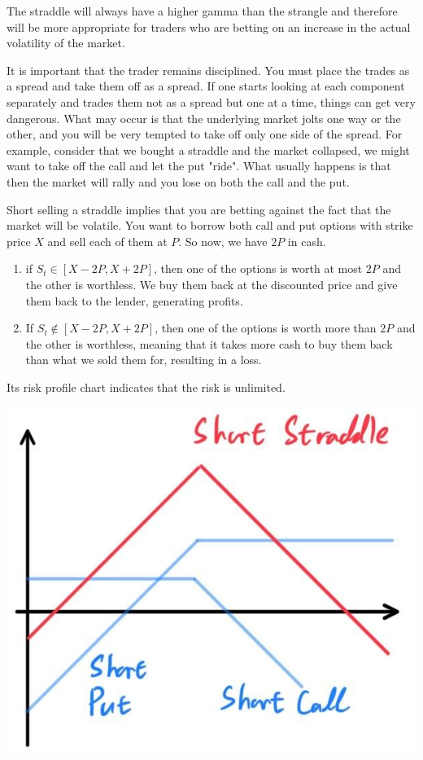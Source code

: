 \documentclass{article}
\begin{document}
  \begin{theorem}
    The straddle will always have a higher gamma than the strangle and therefore will be more appropriate for traders who are betting on an increase in the actual volatility of the market. 
  \end{theorem}

  It is important that the trader remains disciplined. You must place the trades as a spread and take them off as a spread. If one starts looking at each component separately and trades them not as a spread but one at a time, things can get very dangerous. What may occur is that the underlying market jolts one way or the other, and you will be very tempted to take off only one side of the spread. For example, consider that we bought a straddle and the market collapsed, we might want to take off the call and let the put "ride". What usually happens is that then the market will rally and you lose on both the call and the put. 

  \begin{definition}
    Short selling a straddle implies that you are betting against the fact that the market will be volatile. You want to borrow both call and put options with strike price $X$ and sell each of them at $P$. So now, we have $2P$ in cash. 
    \begin{enumerate}
      \item if $S_t \in [X - 2P, X + 2P]$, then one of the options is worth at most $2P$ and the other is worthless. We buy them back at the discounted price and give them back to the lender, generating profits. 
      
      \item If $S_t \not\in [X - 2P, X + 2P]$, then one of the options is worth more than $2P$ and the other is worthless, meaning that it takes more cash to buy them back than what we sold them for, resulting in a loss. 
    \end{enumerate}
    Its risk profile chart indicates that the risk is unlimited. 
    \begin{center}
      \includegraphics[scale=0.3]{img/short_straddle.jpg}
    \end{center}
  \end{definition}
\end{document}
